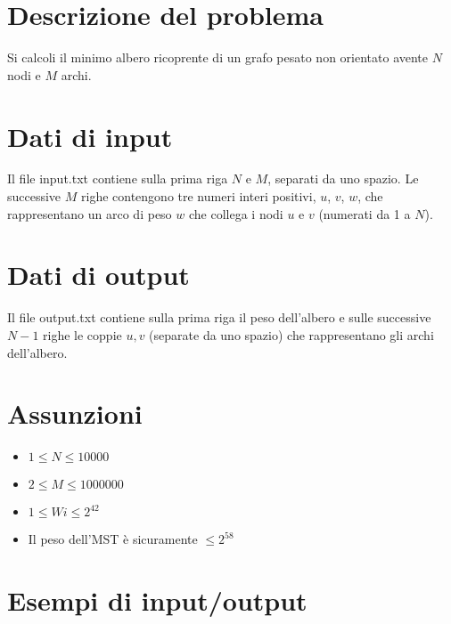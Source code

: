 \documentclass[a4paper,11pt]{article}
\begin{document}
\vspace{0.5cm}



\vspace{0.5cm}

\section*{Descrizione del problema}
  
    Si calcoli il minimo albero ricoprente di un grafo pesato non
    orientato avente $N$ nodi e $M$ archi.
  

\section*{Dati di input}
  
    Il file input.txt contiene sulla prima riga $N$
    e $M$, separati da uno spazio. Le successive $M$
    righe contengono tre numeri interi
    positivi, $u$, $v$, $w$, che
    rappresentano un arco di peso $w$ che collega i
    nodi $u$ e $v$ (numerati da 1 a $N$).
  

\section*{Dati di output}
  
    Il file output.txt contiene sulla prima riga il peso dell'albero e
    sulle successive $N-1$ righe le coppie $u,v$
    (separate da uno spazio) che rappresentano gli archi dell'albero.
  
  \section*{Assunzioni}
  \begin{itemize}
  
    \item $1 ≤ N ≤ 10000$
    \item $2 ≤ M ≤ 1000000$
    \item $1 ≤ Wi ≤ 2^{42}$
    \item Il peso dell'MST è sicuramente $≤ 2^{58}$
  \end{itemize}

\section*{Esempi di input/output}
\end{document}
